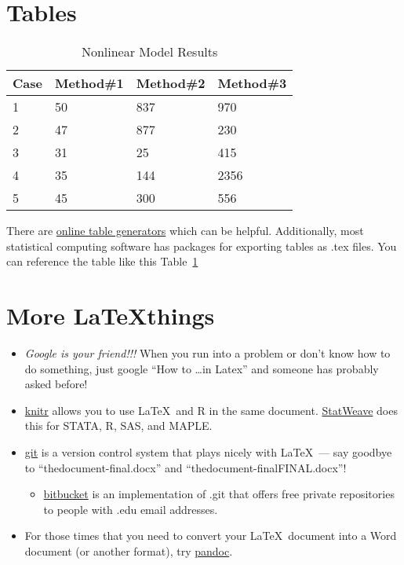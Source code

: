 \documentclass[12pt]{article} %
\begin{document}
\section{Tables}

\begin{table}[hb]
  \caption{Nonlinear Model Results}
  \centering
  \begin{tabular}{@{}llll@{}}
    \toprule  
    Case & Method\#1 & Method\#2 & Method\#3\\[0.5ex]%
\midrule
    1 & 50 & 837 & 970\\
    2 & 47 & 877 & 230\\
    3 & 31 & 25  & 415\\
    4 & 35 & 144 & 2356\\
    5 & 45 & 300 & 556\\
\bottomrule 
  \end{tabular}\label{table:nonlin} %
\end{table}



There are \href{e.g.  http://www.tablesgenerator.com/}{online table
generators} which can be helpful.  Additionally, most statistical
computing software has packages for exporting tables as .tex
files. You can reference the table like this Table~\ref{table:nonlin}

\section{More \LaTeX things}
\begin{itemize}
\item \emph{Google is your friend!!!} When you run into a problem or
  don't know how to do something, just google ``How to \ldots in
  Latex'' and someone has probably asked before!
\item \href{http://yihui.name/knitr/}{knitr} allows you to use
  \LaTeX~and R in the same
  document. \href{http://homepage.stat.uiowa.edu/~rlenth/StatWeave/StatWeave-manual.pdf}{StatWeave}
  does this for STATA, R, SAS, and MAPLE.
\item \href{https://git-scm.com/}{git} is a version control system
  that plays nicely with \LaTeX~--- say goodbye to
 ``thedocument-final.docx''  and ``thedocument-finalFINAL.docx''! 
\begin{itemize}
\item \href{https://bitbucket.org/}{bitbucket} is an implementation of
  .git that offers free private repositories to people with .edu email
  addresses. 
\end{itemize}
\item For those times that you need to convert your \LaTeX~document
  into a Word document (or another format), try
  \href{http://pandoc.org/}{pandoc}.
\end{itemize}
\end{document}
